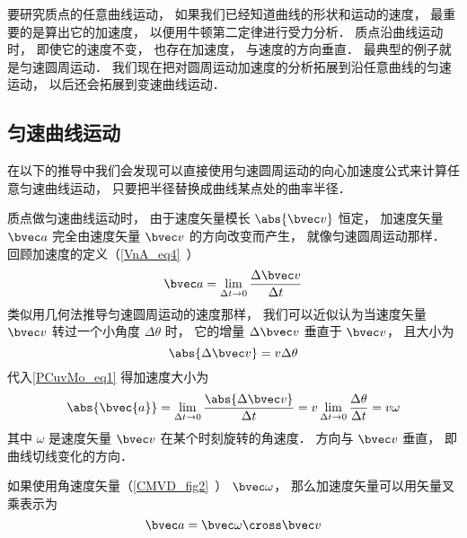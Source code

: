 

要研究质点的任意曲线运动， 如果我们已经知道曲线的形状和运动的速度， 最重要的是算出它的加速度， 以便用牛顿第二定律进行受力分析． 质点沿曲线运动时， 即使它的速度不变， 也存在加速度， 与速度的方向垂直． 最典型的例子就是匀速圆周运动． 我们现在把对圆周运动加速度的分析拓展到沿任意曲线的匀速运动， 以后还会拓展到变速曲线运动．

\subsection{匀速曲线运动}
在以下的推导中我们会发现可以直接使用匀速圆周运动的向心加速度公式来计算任意匀速曲线运动， 只要把半径替换成曲线某点处的曲率半径．

质点做匀速曲线运动时， 由于速度矢量模长 $\abs{\bvec v}$ 恒定， 加速度矢量 $\bvec a$ 完全由速度矢量 $\bvec v$ 的方向改变而产生， 就像匀速圆周运动那样． 回顾加速度的定义（\autoref{VnA_eq4}~）
\begin{equation}\label{PCuvMo_eq2}
\bvec a = \lim_{\Delta t \to 0} \frac{\Delta \bvec v}{\Delta t}
\end{equation}
类似用几何法推导匀速圆周运动的速度那样， 我们可以近似认为当速度矢量 $\bvec v$ 转过一个小角度 $\Delta \theta$ 时， 它的增量 $\Delta \bvec v$ 垂直于 $\bvec v$， 且大小为
\begin{equation}\label{PCuvMo_eq1}
\abs{\Delta \bvec v} = v\Delta\theta
\end{equation}
代入\autoref{PCuvMo_eq1} 得加速度大小为
\begin{equation}\label{PCuvMo_eq4}
\abs{\bvec{a}} = \lim_{\Delta t \to 0} \frac{\abs{\Delta \bvec v}}{\Delta t}
= v\lim_{\Delta t \to 0}\frac{\Delta \theta}{\Delta t} = v\omega
\end{equation}
其中 $\omega$ 是速度矢量 $\bvec v$ 在某个时刻旋转的角速度． 方向与 $\bvec v$ 垂直， 即曲线切线变化的方向．

如果使用角速度矢量（\autoref{CMVD_fig2}~） $\bvec \omega$， 那么加速度矢量可以用矢量叉乘表示为
\begin{equation}
\bvec a = \bvec \omega \cross \bvec v
\end{equation}

